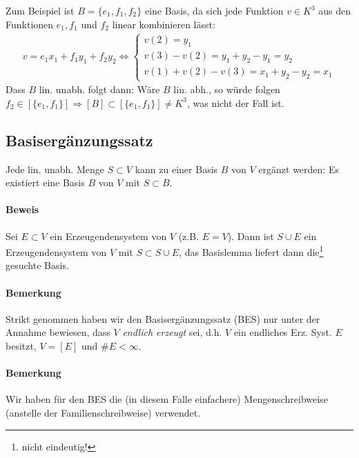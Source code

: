  		Zum Beispiel ist $B=\{e_1,f_1,f_2\}$ eine Basis, da sich jede Funktion $v\in K^3$ aus den Funktionen $e_1,f_1$ und $f_2$ linear kombinieren lässt:
 		\begin{gather*}
 			v=e_1x_1+f_1y_1 + f_2y_2\Leftrightarrow \left\{
 			\begin{array}{l}
 				v(2)=y_1                                   \\
 				v(3) - v(2) = y_1 + y_2 - y_1 = y_2        \\
 				v(1) + v(2) - v(3) = x_1 + y_2 - y_2 = x_1
 			\end{array}
 			\right.
 		\end{gather*}
 		Dass $B$ lin. unabh. folgt dann: Wäre $B$ lin. abh., so würde folgen $f_2\in [\{e_1,f_1\}]\Rightarrow [B] \subset [\{e_1,f_1\}] \neq K^3$, was nicht der Fall ist.

 \subsection{Basisergänzungssatz}
 	\begin{Satz}[Basisergänzungssatz]
 		Jede lin. unabh. Menge $S\subset V$ kann zu einer Basis $B$ von $V$ ergänzt werden: Es existiert eine Basis $B$ von $V$ mit $S\subset B$.
 	\end{Satz}

 	\paragraph{Beweis}
 		Sei $E\subset V$ ein Erzeugendensystem von $V$ (z.B. $E=V$). Dann ist $S\cup E$ ein Erzeugendensystem von $V$ mit $S\subset S\cup E$, das Basislemma liefert dann die\footnote{nicht eindeutig!} gesuchte Basis.

 	\paragraph{Bemerkung}
 		Strikt genommen haben wir den Basisergänzungssatz (BES) nur unter der Annahme bewiesen, dass $V$ \emph{endlich erzeugt} sei, d.h. $V$ ein endliches Erz. Syst. $E$ besitzt, $V=[E]$ und $\#E<\infty$.

 	\paragraph{Bemerkung}
 		Wir haben für den BES die (in diesem Falle einfachere) Mengenschreibweise (anstelle der Familienschreibweise) verwendet.


